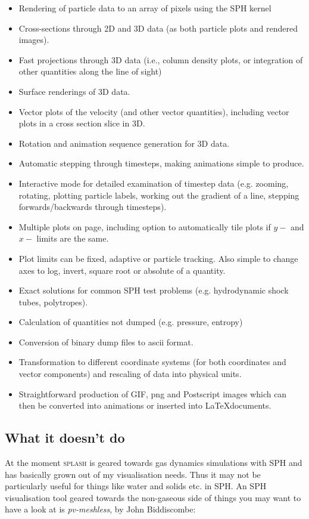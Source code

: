 \documentclass[a4paper,10pt]{article}
\newcommand{\splash}{\textsc{splash }}
\begin{document}
\begin{itemize}
\item Rendering of particle data to an array of pixels using the SPH kernel
\item Cross-sections through 2D and 3D data (as both particle plots and rendered
images).
\item Fast projections through 3D data (i.e., column density plots, or integration of
other quantities along the line of sight)
\item Surface renderings of 3D data.
\item Vector plots of the velocity (and other vector quantities), including vector
plots in a cross section slice in 3D.
\item Rotation and animation sequence generation for 3D data.
\item Automatic stepping through timesteps, making animations simple to produce.
\item Interactive mode for detailed examination of timestep data (e.g. zooming,
rotating, plotting particle labels, working out the gradient of a line, stepping forwards/backwards
through timesteps).
\item Multiple plots on page, including option to automatically tile plots if $y-$ and $x-$ limits
are the same.
\item Plot limits can be fixed, adaptive or particle tracking. Also simple to change
axes to log, invert, square root or absolute of a quantity.
\item Exact solutions for common SPH test problems (e.g. hydrodynamic shock tubes,
polytropes).
\item Calculation of quantities not dumped (e.g. pressure, entropy)
\item Conversion of binary dump files to ascii format.
\item Transformation to different coordinate systems (for both coordinates and
vector components) and rescaling of data into physical units.
\item Straightforward production of GIF, png and Postscript images which can then be
converted into animations or inserted into \LaTeX documents.
\end{itemize}

\subsection{What it doesn't do}
At the moment \splash is geared towards gas dynamics simulations with SPH and has basically grown out of my visualisation needs.
Thus it may not be particularly useful for things like water and solids etc. in SPH. An SPH visualisation tool geared towards the non-gaseous side of things you may want to have a look at is {\it pv-meshless}, by John Biddiscombe:
\end{document}
